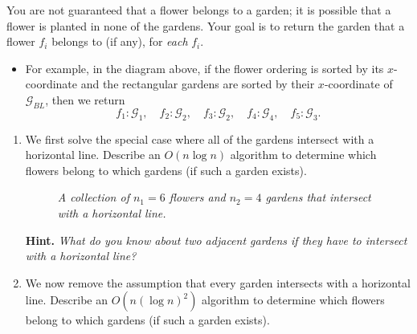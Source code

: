 \documentclass{article}
\begin{document}
\begin{question}
You are not guaranteed that a flower belongs to a garden; it is possible that a flower is planted in none of the gardens. Your goal is to return the garden that a flower $f_i$ belongs to (if any), for {\em each} $f_i$.

\begin{itemize}
    \item For example, in the diagram above, if the flower ordering is sorted by its $x$-coordinate and the rectangular gardens are sorted by their $x$-coordinate of $\mathcal G_{BL}$, then we return \[f_1: \mathcal G_1, \quad f_2: \mathcal G_2, \quad f_3: \mathcal G_2, \quad f_4: \mathcal G_4, \quad f_5: \mathcal G_3.\]
\end{itemize}

\begin{enumerate}[label = (\alph*)]
    \item We first solve the special case where all of the gardens intersect with a horizontal line. Describe an $O(n \log n)$ algorithm to determine which flowers belong to which gardens (if such a garden exists).

    \begin{figure}[H]
        \centering
        \caption{{\em A collection of $n_1 = 6$ flowers and $n_2 = 4$ gardens that intersect with a horizontal line.}}
    \end{figure}

    {\bfseries Hint.} {\em What do you know about two adjacent gardens if they have to intersect with a horizontal line?}

    \item We now remove the assumption that every garden intersects with a horizontal line. Describe an $O(n (\log n)^2)$ algorithm to determine which flowers belong to which gardens (if such a garden exists).
\end{enumerate}
\end{question}
\end{document}
